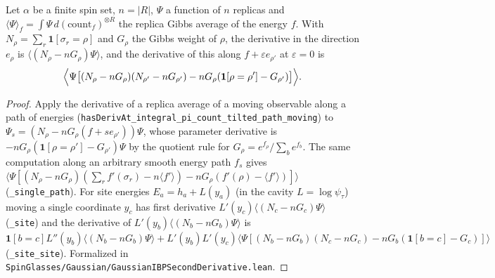\begin{lemma}\label{lem:sg-tal:perceptron-replica-hessian}
  \leanok
{}
Let $\alpha$ be a finite spin set, $n=|R|$, $\Psi$ a function of $n$ replicas and $\langle\Psi\rangle_f=\int\Psi\,d(\mathrm{count}_f)^{\otimes R}$ the replica Gibbs average of the energy $f$. With $N_\rho=\sum_r\mathbf 1[\sigma_r=\rho]$ and $G_\rho$ the Gibbs weight of $\rho$, the derivative in the direction $e_\rho$ is $\langle(N_\rho-nG_\rho)\Psi\rangle$, and the derivative of this along $f+\varepsilon e_{\rho'}$ at $\varepsilon=0$ is
\[
\Bigl\langle\Psi\bigl[(N_\rho-nG_\rho)(N_{\rho'}-nG_{\rho'})-nG_\rho(\mathbf 1[\rho=\rho']-G_{\rho'})\bigr]\Bigr\rangle.
\]
\end{lemma}
\begin{proof}
  \leanok
Apply the derivative of a replica average of a moving observable along a path of energies (\texttt{hasDerivAt\_integral\_pi\_count\_tilted\_path\_moving}) to $\Psi_s=(N_\rho-nG_\rho(f+se_{\rho'}))\Psi$, whose parameter derivative is $-nG_\rho(\mathbf 1[\rho=\rho']-G_{\rho'})\Psi$ by the quotient rule for $G_\rho=e^{f_\rho}/\sum_be^{f_b}$.
The same computation along an arbitrary smooth energy path $f_s$ gives $\langle\Psi[(N_\rho-nG_\rho)(\sum_rf'(\sigma_r)-n\langle f'\rangle)-nG_\rho(f'(\rho)-\langle f'\rangle)]\rangle$ (\texttt{\_single\_path}). For site energies $E_a=h_a+L(y_a)$ (in the cavity $L=\log\psi_\tau$) moving a single coordinate $y_c$ has first derivative $L'(y_c)\langle(N_c-nG_c)\Psi\rangle$ (\texttt{\_site}) and the derivative of $L'(y_b)\langle(N_b-nG_b)\Psi\rangle$ is $\mathbf 1[b=c]L''(y_b)\langle(N_b-nG_b)\Psi\rangle+L'(y_b)L'(y_c)\langle\Psi[(N_b-nG_b)(N_c-nG_c)-nG_b(\mathbf 1[b=c]-G_c)]\rangle$ (\texttt{\_site\_site}).
Formalized in \texttt{SpinGlasses/Gaussian/GaussianIBPSecondDerivative.lean}.
\end{proof}

